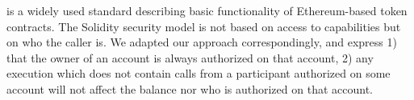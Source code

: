   is a widely used %
 standard describing  basic functionality of Ethereum-based token 
contracts. 
The Solidity security model is not based on access to  capabilities but on who the caller  is. 
We  adapted our approach correspondingly, and 
%
express 1) that  the owner of an account is always authorized on that account,  2) any execution which does not contain calls from a participant  authorized on some account will not affect the balance nor  who is authorized on  that account. 

